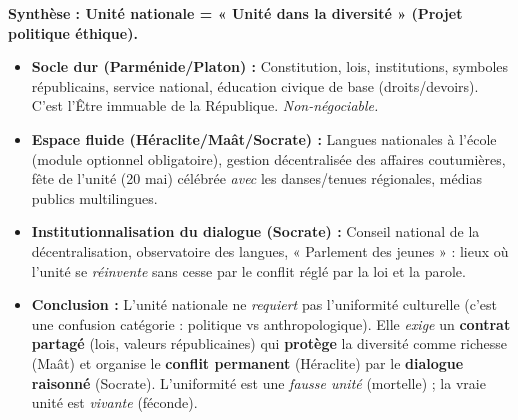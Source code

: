 \documentclass[11pt]{article}
\begin{document}
\begin{exoresolu}
\textbf{Synthèse : Unité nationale = « Unité dans la diversité » (Projet politique éthique).}\par
\begin{itemize}
    \item \textbf{Socle dur (Parménide/Platon) :} Constitution, lois, institutions, symboles républicains, service national, éducation civique de base (droits/devoirs). C'est l'Être immuable de la République. \emph{Non-négociable.}
    \item \textbf{Espace fluide (Héraclite/Maât/Socrate) :} Langues nationales à l'école (module optionnel obligatoire), gestion décentralisée des affaires coutumières, fête de l'unité (20 mai) célébrée \emph{avec} les danses/tenues régionales, médias publics multilingues.
    \item \textbf{Institutionnalisation du dialogue (Socrate) :} Conseil national de la décentralisation, observatoire des langues, « Parlement des jeunes » : lieux où l'unité se \emph{réinvente} sans cesse par le conflit réglé par la loi et la parole.
    \item \textbf{Conclusion :} L'unité nationale ne \emph{requiert} pas l'uniformité culturelle (c'est une confusion catégorie : politique vs anthropologique). Elle \emph{exige} un \textbf{contrat partagé} (lois, valeurs républicaines) qui \textbf{protège} la diversité comme richesse (Maât) et organise le \textbf{conflit permanent} (Héraclite) par le \textbf{dialogue raisonné} (Socrate). L'uniformité est une \emph{fausse unité} (mortelle) ; la vraie unité est \emph{vivante} (féconde).
\end{itemize}


\end{exoresolu}
\end{document}
